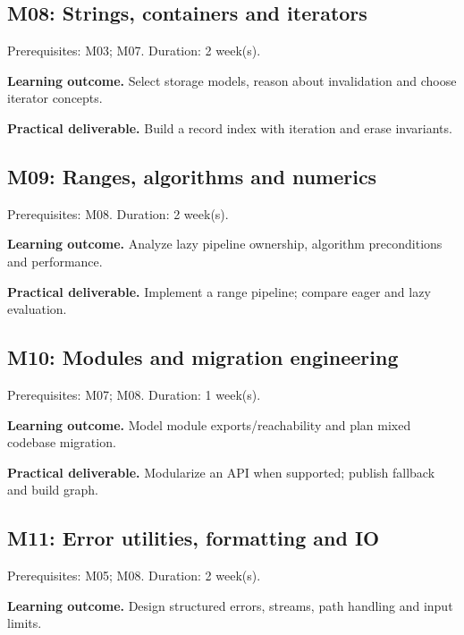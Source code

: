 \documentclass[11pt]{article}
\begin{document}
\subsection{M08: Strings, containers and iterators}
Prerequisites: M03; M07. Duration: 2 week(s).

\textbf{Learning outcome.} Select storage models, reason about invalidation and choose iterator concepts.

\textbf{Practical deliverable.} Build a record index with iteration and erase invariants.

\subsection{M09: Ranges, algorithms and numerics}
Prerequisites: M08. Duration: 2 week(s).

\textbf{Learning outcome.} Analyze lazy pipeline ownership, algorithm preconditions and performance.

\textbf{Practical deliverable.} Implement a range pipeline; compare eager and lazy evaluation.

\subsection{M10: Modules and migration engineering}
Prerequisites: M07; M08. Duration: 1 week(s).

\textbf{Learning outcome.} Model module exports/reachability and plan mixed codebase migration.

\textbf{Practical deliverable.} Modularize an API when supported; publish fallback and build graph.

\subsection{M11: Error utilities, formatting and IO}
Prerequisites: M05; M08. Duration: 2 week(s).

\textbf{Learning outcome.} Design structured errors, streams, path handling and input limits.
\end{document}
